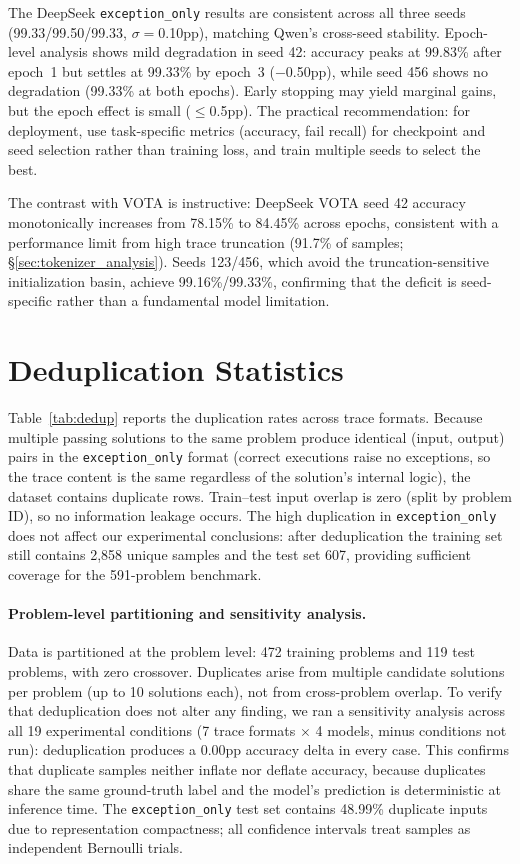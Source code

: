 The DeepSeek \texttt{exception\_only} results are consistent across all three seeds (99.33/99.50/99.33, $\sigma{=}$0.10pp), matching Qwen's cross-seed stability.
Epoch-level analysis shows mild degradation in seed 42: accuracy peaks at 99.83\% after epoch~1 but settles at 99.33\% by epoch~3 ($-$0.50pp), while seed 456 shows no degradation (99.33\% at both epochs).
Early stopping may yield marginal gains, but the epoch effect is small (${\leq}$0.5pp).
The practical recommendation: for deployment, use task-specific metrics (accuracy, fail recall) for checkpoint and seed selection rather than training loss, and train multiple seeds to select the best.

The contrast with VOTA is instructive: DeepSeek VOTA seed 42 accuracy monotonically increases from 78.15\% to 84.45\% across epochs, consistent with a performance limit from high trace truncation (91.7\% of samples; \S\ref{sec:tokenizer_analysis}).
Seeds 123/456, which avoid the truncation-sensitive initialization basin, achieve 99.16\%/99.33\%, confirming that the deficit is seed-specific rather than a fundamental model limitation.

\section{Deduplication Statistics}
\label{sec:dedup_stats}

Table~\ref{tab:dedup} reports the duplication rates across trace formats.
Because multiple passing solutions to the same problem produce identical (input, output) pairs in the \texttt{exception\_only} format (correct executions raise no exceptions, so the trace content is the same regardless of the solution's internal logic), the dataset contains duplicate rows.
Train--test input overlap is zero (split by problem ID), so no information leakage occurs.
The high duplication in \texttt{exception\_only} does not affect our experimental conclusions: after deduplication the training set still contains 2,858 unique samples and the test set 607, providing sufficient coverage for the 591-problem benchmark.

\paragraph{Problem-level partitioning and sensitivity analysis.}
Data is partitioned at the problem level: 472 training problems and 119 test problems, with zero crossover.
Duplicates arise from multiple candidate solutions per problem (up to 10 solutions each), not from cross-problem overlap.
To verify that deduplication does not alter any finding, we ran a sensitivity analysis across all 19 experimental conditions (7 trace formats $\times$ 4 models, minus conditions not run): deduplication produces a 0.00pp accuracy delta in every case.
This confirms that duplicate samples neither inflate nor deflate accuracy, because duplicates share the same ground-truth label and the model's prediction is deterministic at inference time.
The \texttt{exception\_only} test set contains 48.99\% duplicate inputs due to representation compactness; all confidence intervals treat samples as independent Bernoulli trials.

